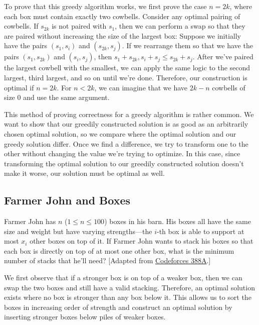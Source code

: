 To prove that this greedy algorithm works, we first prove the case $n = 2k$, where each box must contain exactly two cowbells. Consider any optimal pairing of cowbells. If $s_{2k}$ is not paired with $s_1$, then we can perform a swap so that they are paired without increasing the size of the largest box: Suppose we initially have the pairs $(s_1, s_i)$ and $(s_{2k}, s_j)$. If we rearrange them so that we have the pairs $(s_1, s_{2k})$ and $(s_i, s_j)$, then $s_1 + s_{2k}, s_i + s_j \le s_{2k} + s_j$. After we've paired the largest cowbell with the smallest, we can apply the same logic to the second largest, third largest, and so on until we're done. Therefore, our construction is optimal if $n = 2k$. For $n < 2k$, we can imagine that we have $2k - n$ cowbells of size $0$ and use the same argument.

This method of proving correctness for a greedy algorithm is rather common. We want to show that our greedily constructed solution is as good as an arbitrarily chosen optimal solution, so we compare where the optimal solution and our greedy solution differ. Once we find a difference, we try to transform one to the other without changing the value we're trying to optimize. In this case, since transforming the optimal solution to our greedily constructed solution doesn't make it worse, our solution must be optimal as well.

\subsection{Farmer John and Boxes}

\begin{typewriter}
  Farmer John has $n$ ($1 \le n \le 100$) boxes in his barn. His boxes all have the same size and weight but have varying strengths---the $i$-th box is able to support at most $x_i$ other boxes on top of it. If Farmer John wants to stack his boxes so that each box is directly on top of at most one other box, what is the minimum number of stacks that he'll need? [Adapted from \href{http://codeforces.com/problemset/problem/388/A}{Codeforces 388A}.]
\end{typewriter}

We first observe that if a stronger box is on top of a weaker box, then we can swap the two boxes and still have a valid stacking. Therefore, an optimal solution exists where no box is stronger than any box below it. This allows us to sort the boxes in increasing order of strength and construct an optimal solution by inserting stronger boxes below piles of weaker boxes.

